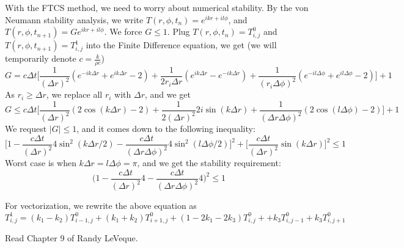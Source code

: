 \documentclass[12pt]{article}
\begin{document}
With the FTCS method, we need to worry about numerical stability. By the von Neumann stability analysis, we write $T(r,\phi, t_n)=e^{ikr+il\phi}$, and $T(r,\phi, t_{n+1})=Ge^{ikr+il\phi}$. We force $G\leq 1$. Plug $T(r,\phi, t_n)=T^0_{i,j}$ and $T(r,\phi, t_{n+1})=T^1_{i,j}$ into the Finite Difference equation, we get (we will temporarily denote $c=\frac{k}{\rho c}$)
\begin{equation}
G = c\Delta t \bigg[\frac{1}{(\Delta r)^2}(e^{-ik\Delta r}+e^{ik\Delta r}-2)+\frac{1}{2r_i\Delta r}(e^{ik\Delta r}-e^{-ik\Delta r})+\frac{1}{(r_i\Delta \phi)^2}(e^{-il\Delta \phi}+e^{il\Delta \phi}-2)\bigg]+1
\end{equation}
As $r_i\geq \Delta r$, we replace all $r_i$ with $\Delta r$, and we get 
\begin{equation}
G\leq c\Delta t \bigg[\frac{1}{(\Delta r)^2}(2\cos(k\Delta r)-2)+\frac{1}{2(\Delta r)^2}2i\sin(k\Delta r)+\frac{1}{(\Delta r\Delta \phi)^2}(2\cos(l\Delta \phi)-2)\bigg]+1
\end{equation}
We request $|G|\leq 1$, and it comes down to the following inequality:
\begin{equation}
\bigg[1-\frac{c\Delta t}{(\Delta r)^2}4\sin^2(k\Delta r/2)-\frac{c\Delta t}{(\Delta r\Delta \phi)^2}4\sin^2(l\Delta \phi/2)\bigg]^2+\bigg[\frac{c\Delta t}{(\Delta r)^2}\sin(k\Delta r)\bigg]^2\leq 1
\end{equation}
Worst case is when $k\Delta r = l\Delta \phi = \pi$, and we get the stability requirement: 
\begin{equation}
\bigg(1-\frac{c\Delta t}{(\Delta r)^2}4-\frac{c\Delta t}{(\Delta r\Delta \phi)^2}4\bigg)^2\leq 1
\end{equation}


For vectorization, we rewrite the above equation as 
\begin{equation}
T^1_{i,j}= (k_1-k_2)T^0_{i-1,j}+(k_1+k_2)T^0_{i+1,j}+(1-2k_1-2k_3)T^0_{i,j}+
+k_3T^0_{i,j-1}+k_3T^0_{i,j+1}
\end{equation}

Read Chapter 9 of Randy LeVeque. 

\end{document}
